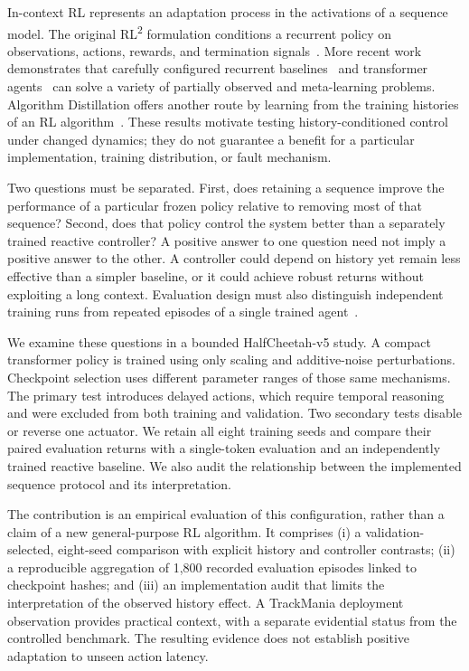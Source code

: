 \documentclass[runningheads]{llncs}
\newcommand{\rltwo}{RL\textsuperscript{2}}
\begin{document}
In-context RL represents an adaptation process in the activations of a sequence model. The original \rltwo{} formulation conditions a recurrent policy on observations, actions, rewards, and termination signals~\cite{rl2}. More recent work demonstrates that carefully configured recurrent baselines~\cite{ni} and transformer agents~\cite{amago} can solve a variety of partially observed and meta-learning problems. Algorithm Distillation offers another route by learning from the training histories of an RL algorithm~\cite{ad}. These results motivate testing history-conditioned control under changed dynamics; they do not guarantee a benefit for a particular implementation, training distribution, or fault mechanism.

Two questions must be separated. First, does retaining a sequence improve the performance of a particular frozen policy relative to removing most of that sequence? Second, does that policy control the system better than a separately trained reactive controller? A positive answer to one question need not imply a positive answer to the other. A controller could depend on history yet remain less effective than a simpler baseline, or it could achieve robust returns without exploiting a long context. Evaluation design must also distinguish independent training runs from repeated episodes of a single trained agent~\cite{empirical}.

We examine these questions in a bounded HalfCheetah-v5 study. A compact transformer policy is trained using only scaling and additive-noise perturbations. Checkpoint selection uses different parameter ranges of those same mechanisms. The primary test introduces delayed actions, which require temporal reasoning and were excluded from both training and validation. Two secondary tests disable or reverse one actuator. We retain all eight training seeds and compare their paired evaluation returns with a single-token evaluation and an independently trained reactive baseline. We also audit the relationship between the implemented sequence protocol and its interpretation.

The contribution is an empirical evaluation of this configuration, rather than a claim of a new general-purpose RL algorithm. It comprises (i) a validation-selected, eight-seed comparison with explicit history and controller contrasts; (ii) a reproducible aggregation of 1,800 recorded evaluation episodes linked to checkpoint hashes; and (iii) an implementation audit that limits the interpretation of the observed history effect. A TrackMania deployment observation provides practical context, with a separate evidential status from the controlled benchmark. The resulting evidence does not establish positive adaptation to unseen action latency.
\end{document}

